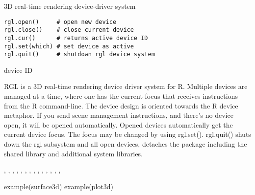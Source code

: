 \begin{Description}\relax
3D real-time rendering device-driver system
\end{Description}
\begin{Usage}
\begin{verbatim}
rgl.open()     # open new device
rgl.close()    # close current device
rgl.cur()      # returns active device ID
rgl.set(which) # set device as active
rgl.quit()     # shutdown rgl device system
\end{verbatim}
\end{Usage}
\begin{Arguments}
\begin{ldescription}
\item[\code{which}] device ID
\end{ldescription}
\end{Arguments}
\begin{Details}\relax
RGL is a 3D real-time rendering device driver system for R.
Multiple devices are managed at a time, where one has the current focus
that receives instructions from the R command-line.
The device design is oriented towards the R device metaphor. If you send
scene management instructions, and there's no device open, it will be opened
automatically.
Opened devices automatically get the current device focus. The focus may be
changed by using rgl.set().
rgl.quit() shuts down the rgl subsystem and all open devices, 
detaches the package including the shared library and additional system libraries.
\end{Details}
\begin{SeeAlso}\relax
{}, 
,
,
,
,
,
,
,
,
,
,
,
,
,
\end{SeeAlso}
\begin{Examples}
\begin{ExampleCode}
example(surface3d)
example(plot3d)
\end{ExampleCode}
\end{Examples}

